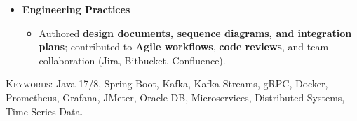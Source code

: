 \begin{itemize}[leftmargin=*, itemsep=0.3em, topsep=0.05em]
\begin{itemize}[leftmargin=1.5em, itemsep=0.12em]
        \item Implemented \textbf{database-driven feature toggles} for \textbf{PNR routing}, enabling \textbf{safe, phased rollouts with fallback}.
    \end{itemize}

    \item \textbf{Engineering Practices}
    \begin{itemize}[leftmargin=1.5em, itemsep=0.12em]
        \item Authored \textbf{design documents, sequence diagrams, and integration plans}; contributed to \textbf{Agile workflows}, \textbf{code reviews}, and team collaboration (Jira, Bitbucket, Confluence).
    \end{itemize}

\end{itemize}

\vspace{-0.1em}
\noindent\small
\textsc{Keywords:} Java 17/8, Spring Boot, Kafka, Kafka Streams, gRPC, Docker, Prometheus, Grafana, JMeter, Oracle DB, Microservices, Distributed Systems, Time-Series Data.
\normalsize